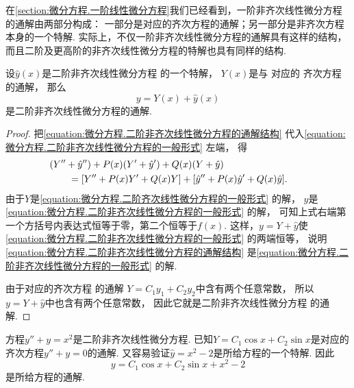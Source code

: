 在\cref{section:微分方程.一阶线性微分方程}我们已经看到，一阶非齐次线性微分方程的通解由两部分构成：
一部分是对应的齐次方程的通解；另一部分是非齐次方程本身的一个特解.
实际上，不仅一阶非齐次线性微分方程的通解具有这样的结构，
而且二阶及更高阶的非齐次线性微分方程的特解也具有同样的结构.
\begin{theorem}\label{theorem:微分方程.二阶非齐次线性微分方程的通解结构}
设\(\hat{y}(x)\)是二阶非齐次线性微分方程  的一个特解，
\(Y(x)\)是与  对应的
齐次方程  的通解，
那么\begin{equation}\label{equation:微分方程.二阶非齐次线性微分方程的通解结构}
	y=Y(x)+\hat{y}(x)
\end{equation}是二阶非齐次线性微分方程的通解.
\begin{proof}
把\cref{equation:微分方程.二阶非齐次线性微分方程的通解结构}
代入\cref{equation:微分方程.二阶非齐次线性微分方程的一般形式} 左端，
得\begin{align*}
	&\hspace{-20pt}
	(Y'' + \hat{y}'')
	+ P(x) (Y' + \hat{y}')
	+ Q(x) (Y + \hat{y}) \\
	&= [Y'' + P(x) Y' + Q(x) Y]
	+ [\hat{y}'' + P(x) \hat{y}' + Q(x) \hat{y}].
\end{align*}
由于\(Y\)是\cref{equation:微分方程.二阶齐次线性微分方程的一般形式} 的解，
\(\hat{y}\)是\cref{equation:微分方程.二阶非齐次线性微分方程的一般形式} 的解，
可知上式右端第一个方括号内表达式恒等于零，第二个恒等于\(f(x)\).
这样，\(y = Y + \hat{y}\)使
\cref{equation:微分方程.二阶非齐次线性微分方程的一般形式} 的两端恒等，
说明\cref{equation:微分方程.二阶非齐次线性微分方程的通解结构}
是\cref{equation:微分方程.二阶非齐次线性微分方程的一般形式} 的解.

由于对应的齐次方程  的通解
\(Y = C_1 y_1 + C_2 y_2\)中含有两个任意常数，
所以\(y = Y + \hat{y}\)中也含有两个任意常数，
因此它就是二阶非齐次线性微分方程  的通解.
\end{proof}
\end{theorem}

\begin{example}
方程\(y'' + y = x^2\)是二阶非齐次线性微分方程.
已知\(Y = C_1 \cos x + C_2 \sin x\)是对应的齐次方程\(y'' + y = 0\)的通解.
又容易验证\(\hat{y} = x^2 - 2\)是所给方程的一个特解.
因此\[
	y = C_1 \cos x + C_2 \sin x + x^2 - 2
\]是所给方程的通解.
\end{example}

